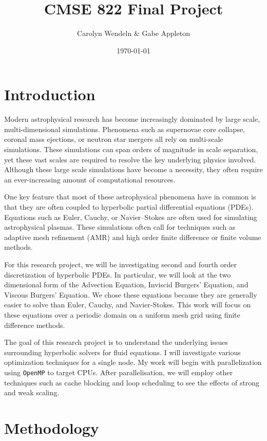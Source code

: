 \documentclass{article}
\title{CMSE 822 Final Project }
\author{Carolyn Wendeln $\&$ Gabe Appleton}
\date{\today}
\begin{document}
\maketitle

\section{Introduction}

Modern astrophysical research has become increasingly dominated by large scale, multi-dimensional simulations.
Phenomena such as supernovae core collapse, coronal mass ejections, or neutron star mergers all rely on multi-scale simulations.
These simulations can span orders of magnitude in scale separation, yet these vast scales are required to resolve the key underlying physics involved.
Although these large scale simulations have become a necessity, they often require an ever-increasing amount of computational resources.

One key feature that most of these astrophysical phenomena have in common is that they are often coupled to hyperbolic partial differential equations (PDEs).
Equations such as Euler, Cauchy, or Navier–Stokes are often used for simulating astrophysical plasmas.
These simulations often call for techniques such as adaptive mesh refinement (AMR) and high order finite difference or finite volume methods.

For this research project, we will be investigating second and fourth order discretization of hyperbolic PDEs.
In particular, we will look at the two dimensional form of the Advection Equation, Inviscid Burgers' Equation, and Viscous Burgers' Equation. We chose these equations because they are generally easier to solve than Euler, Cauchy, and Navier-Stokes. 
This work will focus on these equations over a periodic domain on a uniform mesh grid using finite difference methods.

The goal of this research project is to understand the underlying issues surrounding hyperbolic solvers for fluid equations.
I will investigate various optimization techniques for a single node.
My work will begin with parallelization using \texttt{OpenMP} to target CPUs.
After parallelisation, we will employ other techniques such as cache blocking and loop scheduling to see the effects of strong and weak scaling.


\section{Methodology}
\end{document}
